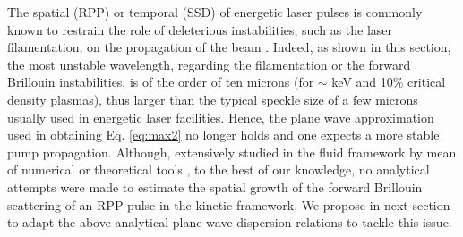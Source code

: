 \documentclass[
 reprint,
 amsmath,amssymb,
 aps,
]{revtex4-1}
\begin{document}
The spatial (RPP) or temporal (SSD) of energetic laser pulses is commonly known to restrain the role of deleterious instabilities, such as the laser filamentation, on the propagation of the beam \cite[]{Kato_1984,NatPhys_Glenzer}. Indeed, as shown in this section, the most unstable wavelength, regarding the filamentation or the forward Brillouin instabilities, is of the order of ten   microns (for $\sim$ keV and 10\% critical density plasmas), thus larger than the typical  speckle size   of a few microns   usually used in energetic laser facilities.  
Hence, the plane wave approximation used in obtaining Eq. \eqref{eq:max2} no longer holds and one expects a more stable pump propagation.
Although, extensively studied in the fluid framework by mean of numerical or theoretical tools \cite[]{POP_Schmitt_Afeyan_98,PRL_Myatt_2001,POP_Maximov_2001,Lushnikov_2006,phd-Grech,POP_Grech_2006,PRL_Grech_2009}, to the best of our knowledge, no analytical attempts were made to estimate the spatial growth of the forward Brillouin scattering of an RPP pulse in the kinetic framework. 
We propose in next section to adapt the above analytical plane wave dispersion relations  to tackle this issue.
\end{document}
